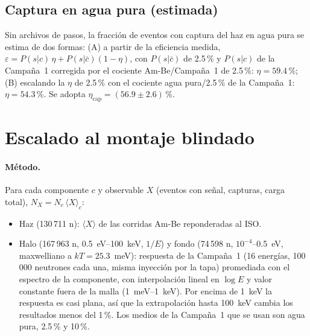 \documentclass[11pt,a4paper]{article}
\begin{document}
\subsection{Captura en agua pura (estimada)}\label{sec:etapura}
Sin archivos de pasos, la fracción de eventos con captura del haz en agua pura se estima de dos formas:
(A) a partir de la eficiencia medida, $\varepsilon=P(s|c)\,\eta+P(s|\bar c)(1-\eta)$, con $P(s|\bar c)$ de 2.5\,\% y
$P(s|c)$ de la Campaña~1 corregida por el cociente Am-Be/Campaña~1 de 2.5\,\%: $\eta=59.4$\,\%; (B) escalando la
$\eta$ de 2.5\,\% con el cociente agua pura/2.5\,\% de la Campaña~1: $\eta=54.3$\,\%. Se adopta
$\eta_\text{cap}=(56.9\pm2.6)$\,\%.

\section{Escalado al montaje blindado}
\paragraph{Método.} Para cada componente $c$ y observable $X$ (eventos con señal, capturas, carga total),
$N_X=N_c\,\langle X\rangle_c$:
\begin{itemize}
\item Haz (130\,711 n): $\langle X\rangle$ de las corridas Am-Be reponderadas al ISO.
\item Halo (167\,963 n, 0.5~eV--100~keV, $1/E$) y fondo (74\,598 n, $10^{-4}$--0.5~eV, maxwelliano a $kT=25.3$~meV): respuesta de la Campaña~1 (16 energías, 100\,000 neutrones cada una, misma inyección por la tapa) promediada con el espectro de la componente, con interpolación lineal en $\log E$ y valor constante fuera de la malla (1~meV--1~keV). Por encima de 1~keV la respuesta es casi plana, así que la extrapolación hasta 100~keV cambia los resultados menos del 1\,\%. Los medios de la Campaña~1 que se usan son agua pura, 2.5\,\% y 10\,\%.
\end{itemize}
\end{document}
